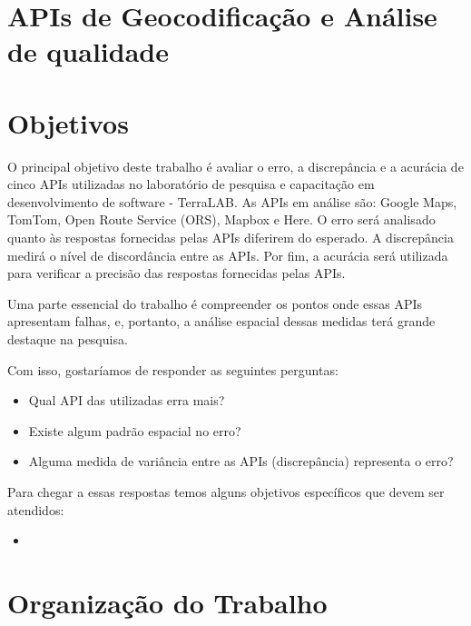 \section{APIs de Geocodificação e Análise de qualidade}
\section{Objetivos}
O principal objetivo deste trabalho é avaliar o erro, a discrepância e a acurácia de cinco APIs utilizadas no laboratório de pesquisa e capacitação em desenvolvimento de software - TerraLAB. As APIs em análise são: Google Maps, TomTom, Open Route Service (ORS), Mapbox e Here. O erro será analisado quanto às respostas fornecidas pelas APIs diferirem do esperado. A discrepância medirá o nível de discordância entre as APIs. Por fim, a acurácia será utilizada para verificar a precisão das respostas fornecidas pelas APIs.

Uma parte essencial do trabalho é compreender os pontos onde essas APIs apresentam falhas, e, portanto, a análise espacial dessas medidas terá grande destaque na pesquisa.

Com isso, gostaríamos de responder as seguintes perguntas:
\begin{itemize}
   \item Qual API das utilizadas erra mais?
   \item Existe algum padrão espacial no erro?
   \item Alguma medida de variância entre as APIs (discrepância) representa o erro? 
\end{itemize}

Para chegar a essas  respostas temos alguns objetivos específicos que devem ser atendidos:
\begin{itemize}
   \item 
\end{itemize}





\section{Organização do Trabalho}

